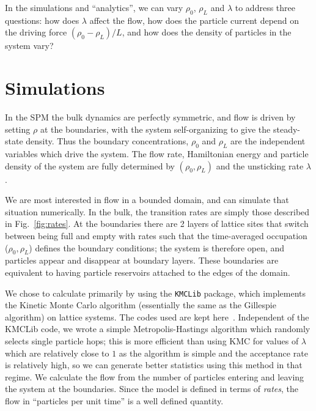 \documentclass[
reprint, amsmath,amssymb,
]{revtex4-1}
\begin{document}
In the simulations and ``analytics'', we can vary $\rho_0$, $\rho_L$ and $\lambda$ to
address three questions: how does $\lambda$ affect the flow, how does
the particle current depend on the driving force $(\rho_0 - \rho_L)/L$, and
how does the density of particles in the system vary?


\section{Simulations}

In the SPM the bulk dynamics are perfectly symmetric, and flow is driven by
setting $\rho$ at the boundaries, with the system self-organizing to
give the steady-state density. Thus the boundary concentrations,
$\rho_0$ and $\rho_L$ are the independent variables which drive the
system.  The flow rate, Hamiltonian energy and particle density of the system are fully determined by  $(\rho_0, \rho_L)$ and the unsticking rate $\lambda$.




We are most interested in flow in a bounded domain, and can simulate that
situation numerically. In the bulk, the transition rates are simply
those described in Fig.~\ref{fig:rates}. At the boundaries there
are 2 layers of lattice sites that switch between being full and empty
with rates such that the time-averaged occupation ($\rho_0, \rho_L$)
defines the boundary conditions; the system is therefore open, and
particles appear and disappear at boundary layers.  These boundaries
are equivalent to having particle reservoirs attached to the edges of the
domain.

We chose to calculate primarily by using the \texttt{KMCLib}\cite{leetmaa2014kmclib}
package, which implements the Kinetic Monte Carlo algorithm
(essentially the same as the Gillespie algorithm\cite{Gillespie1977,
 Bortz1975, Prados1997}) on lattice systems. The codes used are kept
here~\cite{jHellGitRepo}.
Independent of the KMCLib code, we wrote a simple Metropolis-Hastings
algorithm which randomly selects single particle hops; this is more efficient than using KMC for values of
$\lambda$ which are relatively close to $1$ as the algorithm is simple and the acceptance rate is relatively high, so we can generate better statistics using this method in that regime.
We calculate the flow from the number of particles entering and
leaving the system at the boundaries.  Since the model is defined in
terms of {\it rates}, the flow in ``particles per unit time'' is a well
defined quantity.
\end{document}
